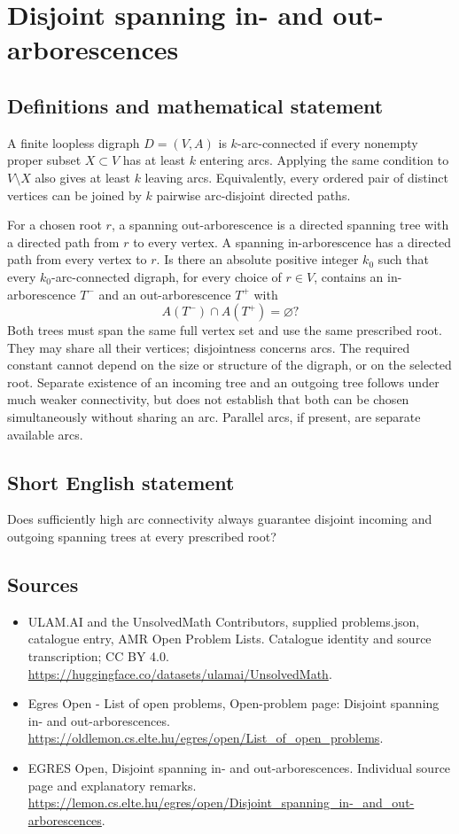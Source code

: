 \documentclass[11pt,a4paper]{article}
\begin{document}
\section*{Disjoint spanning in- and out-arborescences}\label{statement}

\subsection{Definitions and mathematical statement}
A finite loopless digraph $D=(V,A)$ is $k$-arc-connected if every
nonempty proper subset $X\subset V$ has at least $k$ entering arcs.
Applying the same condition to $V\setminus X$ also gives at least
$k$ leaving arcs. Equivalently, every ordered pair of distinct vertices
can be joined by $k$ pairwise arc-disjoint directed paths.

For a chosen root $r$, a spanning out-arborescence is a directed spanning
tree with a directed path from $r$ to every vertex. A spanning
in-arborescence has a directed path from every vertex to $r$.
Is there an absolute positive integer $k_0$ such that every
$k_0$-arc-connected digraph, for every choice of $r\in V$, contains
an in-arborescence $T^-$ and an out-arborescence $T^+$ with
\[
                             A(T^-)\cap A(T^+)=\varnothing?
\]
Both trees must span the same full vertex set and use the same prescribed
root. They may share all their vertices; disjointness concerns arcs.
The required constant cannot depend on the size or structure of the
digraph, or on the selected root. Separate existence of an incoming
tree and an outgoing tree follows under much weaker connectivity,
but does not establish that both can be chosen simultaneously without
sharing an arc. Parallel arcs, if present, are separate available arcs.
\subsection{Short English statement}
Does sufficiently high arc connectivity always guarantee disjoint
incoming and outgoing spanning trees at every prescribed root?
\subsection{Sources}
\begin{itemize}
\item[S1] ULAM.AI and the UnsolvedMath Contributors, supplied problems.json, catalogue entry, AMR Open Problem Lists. Catalogue identity and source transcription; CC BY 4.0.
\url{https://huggingface.co/datasets/ulamai/UnsolvedMath}.
\item[S2] Egres Open - List of open problems, Open-problem page: Disjoint spanning in- and out-arborescences. 
\url{https://oldlemon.cs.elte.hu/egres/open/List_of_open_problems}.
\item[S3] EGRES Open, Disjoint spanning in- and out-arborescences. Individual source page and explanatory remarks.
\url{https://lemon.cs.elte.hu/egres/open/Disjoint_spanning_in-_and_out-arborescences}.
\end{itemize}
\end{document}
